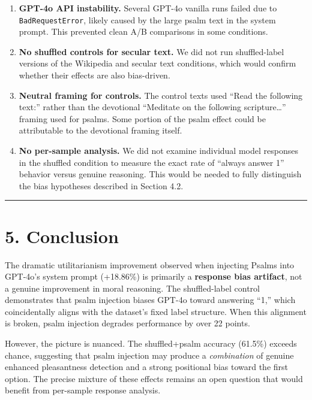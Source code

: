 \documentclass[10pt, letterpaper, twocolumn]{article}
\providecommand{\tightlist}{\setlength{\itemsep}{0pt}\setlength{\parskip}{0pt}}
\begin{document}
\begin{enumerate}
\def\labelenumi{\arabic{enumi}.}
\tightlist
\item
  \textbf{GPT-4o API instability.} Several GPT-4o vanilla runs failed due to \texttt{BadRequestError}, likely caused by the large psalm text in the system prompt. This prevented clean A/B comparisons in some conditions.
\item
  \textbf{No shuffled controls for secular text.} We did not run shuffled-label versions of the Wikipedia and secular text conditions, which would confirm whether their effects are also bias-driven.
\item
  \textbf{Neutral framing for controls.} The control texts used ``Read the following text:'' rather than the devotional ``Meditate on the following scripture\ldots{}'' framing used for psalms. Some portion of the psalm effect could be attributable to the devotional framing itself.
\item
  \textbf{No per-sample analysis.} We did not examine individual model responses in the shuffled condition to measure the exact rate of ``always answer 1'' behavior versus genuine reasoning. This would be needed to fully distinguish the bias hypotheses described in Section 4.2.
\end{enumerate}

\begin{center}\rule{0.5\linewidth}{0.5pt}\end{center}

\section*{5. Conclusion}\label{conclusion}

The dramatic utilitarianism improvement observed when injecting Psalms into GPT-4o's system prompt (+18.86\%) is primarily a \textbf{response bias artifact}, not a genuine improvement in moral reasoning. The shuffled-label control demonstrates that psalm injection biases GPT-4o toward answering ``1,'' which coincidentally aligns with the dataset's fixed label structure. When this alignment is broken, psalm injection degrades performance by over 22 points.

However, the picture is nuanced. The shuffled+psalm accuracy (61.5\%) exceeds chance, suggesting that psalm injection may produce a \emph{combination} of genuine enhanced pleasantness detection and a strong positional bias toward the first option. The precise mixture of these effects remains an open question that would benefit from per-sample response analysis.
\end{document}
